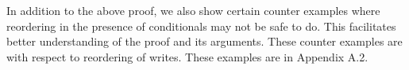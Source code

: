     

    In addition to the above proof, we also show certain counter examples where reordering in the presence of conditionals may not be safe to do. 
    This facilitates better understanding of the proof and its arguments. 
    These counter examples are with respect to reordering of writes. 
    These examples are in Appendix A.2.

    